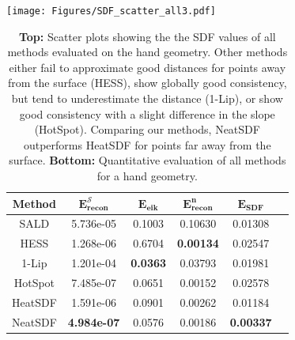 \documentclass[12pt,openany]{book}
\theoremstyle{plainnormal}
\theoremstyle{remark}
\begin{document}
    
\begin{table}
\hspace*{-0.3cm}
\texttt{[image: Figures/SDF\_scatter\_all3.pdf]}
\vspace*{0.5cm}  %
    \par  %
        \begin{tabular}{cccccc}
        \toprule
        \textbf{Method} &$\mathbf{E_{recon}^{\mathcal{S}}}$ & $\mathbf{E_{eik}}$ &$\mathbf{E_{recon}^n}$ & $\mathbf{E_{SDF}}$\\ 
        \midrule
        SALD & 5.736e-05 &  0.1003 & 0.10630 & 0.01308\\ %
        HESS & 1.268e-06  &  0.6704 &\textbf{0.00134} &0.02547   \\ 
        1-Lip   & 1.201e-04   & \textbf{0.0363} &0.03793&0.01981\\  %
        HotSpot  &7.485e-07 &   0.0651 & 0.00152 &  0.02578\\  %
        \midrule
        HeatSDF & 1.591e-06  & 0.0901 &  0.00262&0.01184\\  %
        
        NeatSDF & \textbf{4.984e-07} & 0.0576 & 0.00186 & \textbf{0.00337} \\%
        \bottomrule
    \end{tabular}
    \caption{\textbf{Top:} Scatter plots showing the the SDF values of all methods evaluated on the hand geometry. Other methods either fail to approximate good distances for points away from the surface (HESS), show globally good consistency, but tend to underestimate the distance (1-Lip), or show good consistency with a slight difference in the slope (HotSpot). Comparing our methods, NeatSDF outperforms HeatSDF for points far away from the surface. \textbf{Bottom:} Quantitative evaluation of all methods for a hand geometry.}
    \label{tab:handquant}
\end{table}
\end{document}
